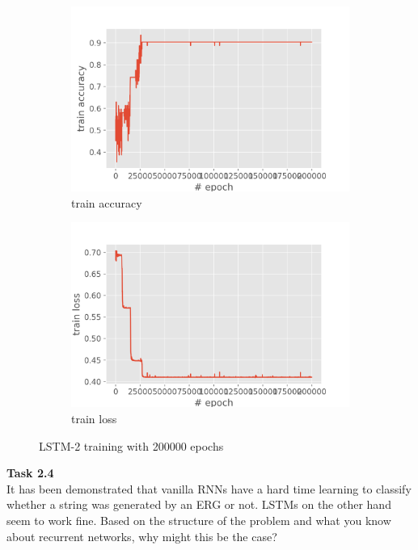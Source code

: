 \documentclass[12pt,article]{article}
\newenvironment{task}[2][Task]
    { \begin{mdframed}[backgroundcolor=gray!20] \textbf{#1 #2} \\}
    {  \end{mdframed}}
\begin{document}
\begin{figure}[H]
\centering
\begin{subfigure}{.5\textwidth}
    \centering
    \includegraphics[scale=0.6]{LSTM-2-200000_parity_train_accuracy.png} \par
    \caption{train accuracy}
\end{subfigure}%
\begin{subfigure}{.5\textwidth}
    \centering
    \includegraphics[scale=0.6]{LSTM-2-200000_parity_train_loss.png} \par
    \caption{train loss}
\end{subfigure}
\caption{LSTM-2 training with 200000 epochs}
\label{fig:lstm2-200000-training}
\end{figure}


\newpage
\begin{task}{2.4} 
It has been demonstrated that vanilla RNNs have a hard time learning to classify whether a string was generated by an ERG or not. LSTMs on the other hand seem to work fine. Based on the structure of the problem and what you know about recurrent networks, why might this be the case? 
\end{task}
\end{document}
